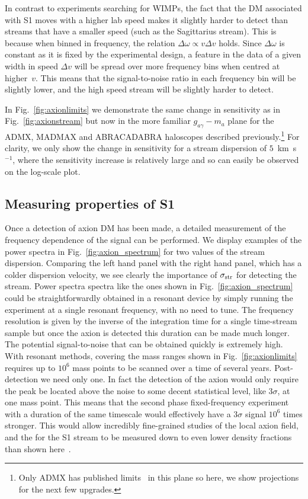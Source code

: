 \documentclass[prd,10pt,twocolumn,showpacs,nofootinbib,aps,superscriptaddress,preprintnumbers]{revtex4-1}
\begin{document}
In contrast to experiments searching for WIMPs, the fact that the DM associated with S1 moves with a higher lab speed
makes it slightly harder to detect than streams that have a smaller speed (such as the Sagittarius stream).
This is because when binned in frequency, the relation $\Delta \omega \propto v \Delta v$ holds. 
Since $\Delta \omega$ is constant as it is fixed by the experimental design, a feature in the data
of a given width in speed $\Delta v$ will be spread over more frequency bins when centred at higher~$v$. 
This means that the signal-to-noise ratio in each frequency bin will be slightly lower, and the high speed
stream will be slightly harder to detect.

 In Fig.~\ref{fig:axionlimits} we demonstrate the same change in sensitivity as in Fig.~\ref{fig:axionstream} 
 but now in the more familiar $g_{a\gamma}-m_a$ plane
for the ADMX, MADMAX and ABRACADABRA haloscopes described previously.\footnote{Only ADMX has published limits~\cite{Du:2018uak} in this plane so here, we show projections for the next few upgrades.} For clarity, we only show the change in sensitivity for a stream dispersion of $5$~km~s$^{-1}$, where the sensitivity increase is relatively large and so can easily be observed on the log-scale plot. 
 

\subsection{Measuring properties of S1}
Once a detection of axion DM has been made, a detailed measurement of the frequency dependence of the signal can be performed.
We display examples of the power spectra in Fig.~\ref{fig:axion_spectrum} for two values of the stream dispersion.
Comparing the left hand panel with the right hand panel, which has a colder dispersion velocity, we see clearly the importance of $\sigma_{\rm str}$ for detecting the stream. Power spectra spectra like the ones shown in Fig.~\ref{fig:axion_spectrum}
could be straightforwardly obtained in a resonant device by simply running the experiment at a single resonant frequency, with no need to tune. 
The frequency resolution is given by the inverse of the integration time for a single time-stream sample but once the axion is detected this duration can be made much longer. The potential signal-to-noise that can be obtained quickly is extremely high. With resonant methods, covering the mass ranges shown in Fig.~\ref{fig:axionlimits} requires up to $10^6$ mass points to be scanned over a time of several years. Post-detection we need only one. In fact the detection of the axion would only require the peak be located above the noise to some decent statistical level, like 3$\sigma$, at one mass point. This means that the second phase fixed-frequency experiment with a duration of the same timescale would effectively have a 3$\sigma$ signal $10^6$ times stronger. This would allow incredibly fine-grained studies of the local axion field, and the for the S1 stream to be measured down to even lower density fractions than shown here~\cite{Foster:2017hbq,OHare:2017yze}.
\end{document}
